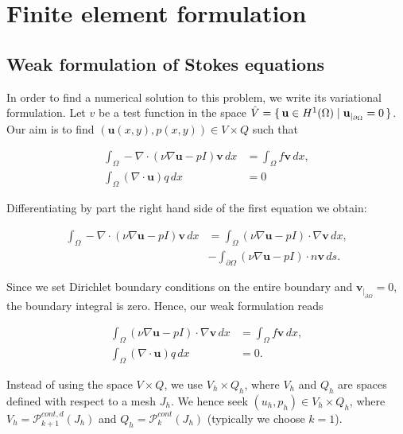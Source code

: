 \documentclass[11pt,a4paper,titlepage]{report}
\begin{document}
\section{Finite element formulation}

\subsection{Weak formulation of Stokes equations}

In order to find a numerical solution to this problem, we write its variational formulation. Let $v$ be a test function in the space $\hat{V} = \set{\mathbf{u} \in H^1(\Omega) | \mathbf{u}_{|_{\partial \Omega}} = 0} $. Our aim is to find $(\mathbf{u}(x,y),p(x,y)) \in V \times Q$ such that

\begin{align}
\int_\Omega -\nabla \cdot (\nu \nabla \mathbf{u} - pI)\mathbf{v} \,dx &= \int_\Omega f \mathbf{v} \,dx, \\
\int_\Omega (\nabla \cdot \mathbf{u})q \,dx &= 0
\end{align}

Differentiating by part the right hand side of the first equation we obtain:

\begin{align}
\int_\Omega -\nabla \cdot (\nu \nabla \mathbf{u} - pI)\mathbf{v} \,dx &= \int_\Omega (\nu \nabla \mathbf{u} - pI) \cdot \nabla \mathbf{v} \,dx, \\
&- \int_{\partial \Omega} (\nu \nabla \mathbf{u} - pI) \cdot n \mathbf{v} \,ds.
\end{align}

Since we set Dirichlet boundary conditions on the entire boundary and $\mathbf{v}_{|_{\partial \Omega}} = 0$, the boundary integral is zero. Hence, our weak formulation reads

\begin{align}
\int_\Omega (\nu \nabla \mathbf{u} - pI) \cdot \nabla \mathbf{v} \,dx &= \int_\Omega f\mathbf{v} \,dx, \\
\int_\Omega (\nabla \cdot \mathbf{u}) q \,dx &= 0.
\end{align}

Instead of using the space $V \times Q$, we use $V_h \times Q_h$, where $V_h$ and $Q_h$ are spaces defined with respect to a mesh $J_h$. We hence seek $(u_h, p_h) \in V_h \times Q_h$, where $V_h = \mathcal{P}^{cont,d}_{k+1} (J_h)$ and $Q_h = \mathcal{P}^{cont}_{k} (J_h)$ (typically we choose $k=1$). \\
\end{document}
